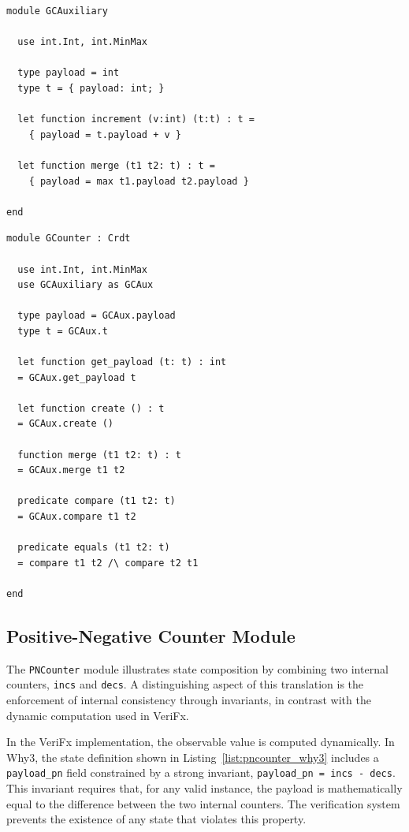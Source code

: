 \begin{lstlisting}[caption={The implementation of Auxiliary module in Why3}, label={list:aux_why3}]
module GCAuxiliary

  use int.Int, int.MinMax

  type payload = int
  type t = { payload: int; }

  let function increment (v:int) (t:t) : t =
    { payload = t.payload + v }

  let function merge (t1 t2: t) : t =
    { payload = max t1.payload t2.payload }

end
\end{lstlisting}

\begin{lstlisting}[caption={The implementation of Grow-only Counter in Why3}, label={list:gcounter_why3}]
module GCounter : Crdt

  use int.Int, int.MinMax
  use GCAuxiliary as GCAux

  type payload = GCAux.payload
  type t = GCAux.t

  let function get_payload (t: t) : int
  = GCAux.get_payload t

  let function create () : t
  = GCAux.create ()

  function merge (t1 t2: t) : t
  = GCAux.merge t1 t2

  predicate compare (t1 t2: t)
  = GCAux.compare t1 t2

  predicate equals (t1 t2: t)
  = compare t1 t2 /\ compare t2 t1

end
\end{lstlisting}

\subsection{Positive-Negative Counter Module}
\label{sub:pncounter_whyml}

The \texttt{PNCounter} module illustrates state composition by combining two internal counters, \texttt{incs} and \texttt{decs}. A distinguishing aspect of this translation is the enforcement of internal consistency through invariants, in contrast with the dynamic computation used in VeriFx.

In the VeriFx implementation, the observable value is computed dynamically. In Why3, the state definition shown in Listing~\ref{list:pncounter_why3} includes a \texttt{payload\_pn} field constrained by a strong invariant, \texttt{payload\_pn = incs - decs}. This invariant requires that, for any valid instance, the payload is mathematically equal to the difference between the two internal counters. The verification system prevents the existence of any state that violates this property.

